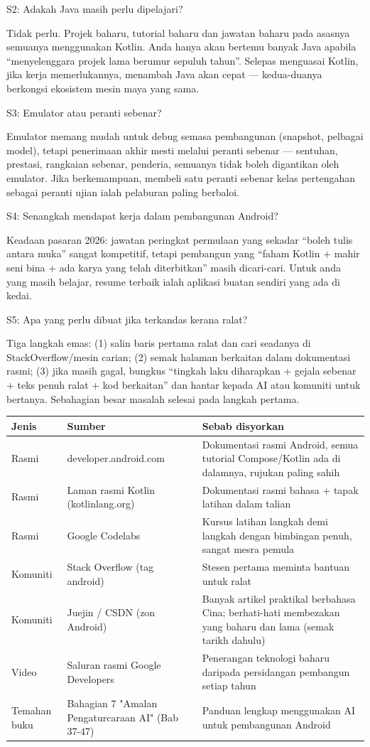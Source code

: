 S2: Adakah Java masih perlu dipelajari?

Tidak perlu. Projek baharu, tutorial baharu dan jawatan baharu pada asasnya semuanya menggunakan Kotlin. Anda hanya akan bertemu banyak Java apabila “menyelenggara projek lama berumur sepuluh tahun”. Selepas menguasai Kotlin, jika kerja memerlukannya, menambah Java akan cepat — kedua-duanya berkongsi ekosistem mesin maya yang sama.

S3: Emulator atau peranti sebenar?

Emulator memang mudah untuk debug semasa pembangunan (snapshot, pelbagai model), tetapi penerimaan akhir mesti melalui peranti sebenar — sentuhan, prestasi, rangkaian sebenar, penderia, semuanya tidak boleh digantikan oleh emulator. Jika berkemampuan, membeli satu peranti sebenar kelas pertengahan sebagai peranti ujian ialah pelaburan paling berbaloi.

S4: Senangkah mendapat kerja dalam pembangunan Android?

Keadaan pasaran 2026: jawatan peringkat permulaan yang sekadar “boleh tulis antara muka” sangat kompetitif, tetapi pembangun yang “faham Kotlin + mahir seni bina + ada karya yang telah diterbitkan” masih dicari-cari. Untuk anda yang masih belajar, resume terbaik ialah aplikasi buatan sendiri yang ada di kedai.

S5: Apa yang perlu dibuat jika terkandas kerana ralat?

Tiga langkah emas: (1) salin baris pertama ralat dan cari seadanya di StackOverflow/mesin carian; (2) semak halaman berkaitan dalam dokumentasi rasmi; (3) jika masih gagal, bungkus “tingkah laku diharapkan + gejala sebenar + teks penuh ralat + kod berkaitan” dan hantar kepada AI atau komuniti untuk bertanya. Sebahagian besar masalah selesai pada langkah pertama.


\begin{center}
\begin{tabularx}{\linewidth}{|X|X|X|}
\hline
\textbf{Jenis} & \textbf{Sumber} & \textbf{Sebab disyorkan} \tabularnewline
\hline
Rasmi & developer.android.com & Dokumentasi rasmi Android, semua tutorial Compose/Kotlin ada di dalamnya, rujukan paling sahih \tabularnewline
Rasmi & Laman rasmi Kotlin (kotlinlang.org) & Dokumentasi rasmi bahasa + tapak latihan dalam talian \tabularnewline
Rasmi & Google Codelabs & Kursus latihan langkah demi langkah dengan bimbingan penuh, sangat mesra pemula \tabularnewline
Komuniti & Stack Overflow (tag android) & Stesen pertama meminta bantuan untuk ralat \tabularnewline
Komuniti & Juejin / CSDN (zon Android) & Banyak artikel praktikal berbahasa Cina; berhati-hati membezakan yang baharu dan lama (semak tarikh dahulu) \tabularnewline
Video & Saluran rasmi Google Developers & Penerangan teknologi baharu daripada persidangan pembangun setiap tahun \tabularnewline
Temahan buku & Bahagian 7 "Amalan Pengaturcaraan AI" (Bab 37-47) & Panduan lengkap menggunakan AI untuk pembangunan Android \tabularnewline
\hline
\end{tabularx}
\end{center}

